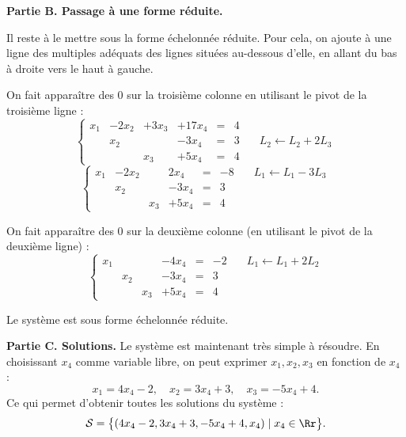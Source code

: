 \documentclass[class=report,crop=false]{standalone}
\begin{document}
\bigskip

\textbf{Partie B. Passage à une forme réduite.}

Il reste à le mettre sous la forme échelonnée réduite.
Pour cela, on ajoute à une ligne des multiples adéquats des lignes situées
au-dessous d'elle, en allant du bas à droite vers le haut à gauche.


On fait apparaître des $0$ sur la troisième colonne en utilisant le pivot de la troisième ligne :
\[\left\{\begin{array}{ccccccr}
x_1 &-2x_2&+3x_3& +17x_4 &=& 4 & \\
    & x_2 &     & -3x_4  &=& 3 & {\scriptstyle \quad L_2 \leftarrow L_2 + 2L_3}\\
    &     & x_3 & +5x_4  &=& 4  &
\end{array} \right.
\]\[
\left\{\begin{array}{ccccccr}
x_1 &-2x_2&     & 2x_4 &=& -8 & {\scriptstyle \quad L_1 \leftarrow L_1 -3 L_3}\\
    & x_2 &     & -3x_4 &=& 3  & \\
    &     & x_3 & +5x_4  &=& 4  &
\end{array} \right. \]

On fait apparaître des $0$ sur la deuxième colonne (en utilisant le pivot de la deuxième ligne) :
\[\left\{\begin{array}{ccccccr}
x_1 &     &     & -4x_4 &=& -2 & {\scriptstyle \quad L_1 \leftarrow L_1 + 2L_2}\\
    & x_2 &     & -3x_4 &=& 3  & \\
    &     & x_3 & +5x_4 &=& 4  &
\end{array} \right. \]

Le système est sous forme échelonnée réduite.

\bigskip

\textbf{Partie C. Solutions.}
Le système est maintenant très simple à résoudre. En choisissant $x_4$ comme variable libre, on peut exprimer
$x_1,x_2,x_3$ en fonction de $x_4$ :
$$x_1=4x_4-2, \quad x_2 = 3x_4+3,\quad x_3=-5x_4+4.$$
Ce qui permet d'obtenir toutes les solutions du système :
$$\mathcal{S}= \big\lbrace (4x_4-2,3x_4+3,-5x_4+4,x_4) \mid x_4 \in \Rr \big\rbrace.$$
\end{document}
